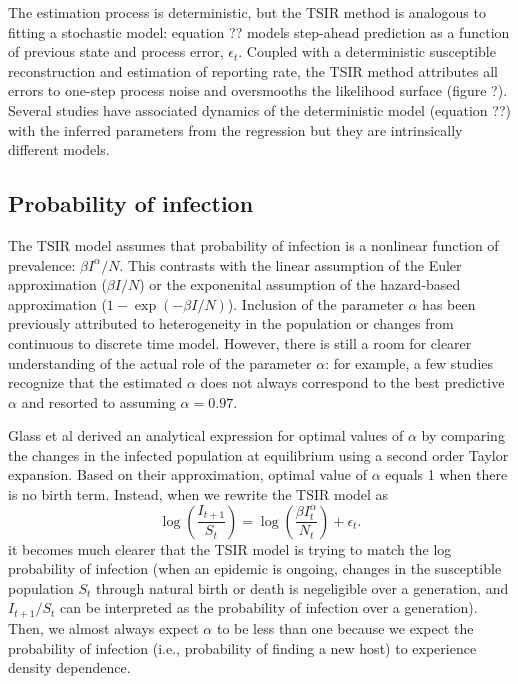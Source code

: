 \documentclass{article}
\begin{document}
The estimation process is deterministic, but the TSIR method is analogous to fitting a stochastic model: 
equation ?? models step-ahead prediction as a function of previous state and process error, $\epsilon_t$. 
Coupled with a deterministic susceptible reconstruction and estimation of reporting rate, the TSIR method attributes all errors to one-step process noise and oversmooths the likelihood surface (figure ?).
Several studies have associated dynamics of the deterministic model (equation ??) with the inferred parameters from the regression but they are intrinsically different models.

\subsection{Probability of infection}

The TSIR model assumes that probability of infection is a nonlinear function of prevalence: $\beta I^\alpha/N$.
This contrasts with the linear assumption of the Euler approximation ($\beta I/N$) or the exponenital assumption of the hazard-based approximation ($1 - \exp(- \beta I/N)$).
Inclusion of the parameter $\alpha$ has been previously attributed to heterogeneity in the population or changes from continuous to discrete time model.
However, there is still a room for clearer understanding of the actual role of the parameter $\alpha$:
for example, a few studies recognize that the estimated $\alpha$ does not always correspond to the best predictive $\alpha$ and resorted to assuming $\alpha = 0.97$.

Glass et al derived an analytical expression for optimal values of $\alpha$ by comparing the changes in the infected population at equilibrium using a second order Taylor expansion. 
Based on their approximation, optimal value of $\alpha$ equals 1 when there is no birth term.
Instead, when we rewrite the TSIR model as 
\begin{equation}
\log \left(\frac{I_{t+1}}{S_t}\right) = \log\left(\frac{\beta I_t^\alpha}{N_t}\right) + \epsilon_t.
\end{equation}
it becomes much clearer that the TSIR model is trying to match the log probability of infection (when an epidemic is ongoing, changes in the susceptible population $S_t$ through natural birth or death is negeligible over a generation, and $I_{t+1}/S_t$ can be interpreted as the probability of infection over a generation). 
Then, we almost always expect $\alpha$ to be less than one because we expect the probability of infection (i.e., probability of finding a new host) to experience density dependence.
\end{document}
